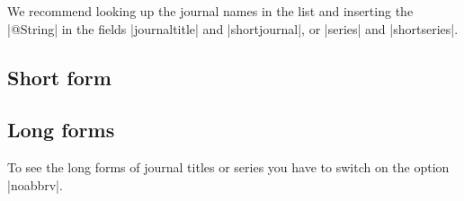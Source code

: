 \documentclass[a4paper,
10pt,
greek,
french,
spanish,
italian,
ngerman,
english
]{ltxdoc}
\begin{document}
We recommend  looking up the journal names in the list and inserting the |@String| in the fields  |journaltitle| and |shortjournal|, or |series| and |shortseries|.


\subsection{Short form} \label{liste-kurz}
\begin{multicols}{2}

\end{multicols}


\subsection{Long forms}\label{liste-lang}
To see the long forms of journal titles or series you have to switch on the option  |noabbrv|.



\end{document}
